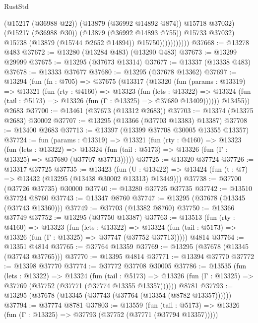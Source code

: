 \begin{lexlean}{RustStd}
\begin{coremodule}
                              (@15217 (@36988 @22))
                              (@13879 (@36992 @14892 @874))
                              @15718
                              @37032)
                            (@15217 (@36988 @30))
                            (@13879 (@36992 @14893 @755))
                            @15733
                            @37032)
                          @15738
                          (@13879 (@15744 @2652 @14894))
                          @15750)))))))))))
@37668 := @13278 @483
@37672 := @13280 (@13284 @483) (@13290 @483)
@37673 := @13299 @29999
@37675 := @13295 (@37673 @13314)
@37677 := @13337 (@13338 @483)
@37678 := @13333 @37677
@37680 := @13295 (@37678 @13362)
@37697 := @13294
    (fun (fn : @705) =>
    @37675
      (@13317
        (@13320
          (fun (params : @13319) =>
          @13321
            (fun (rty : @4160) =>
            @13323
              (fun (lets : @13322) =>
              @13324 (fun (tail : @5173) => @13326 (fun (Γ : @13325) => @37680 @13409))))))
        @13455))
    @2683
@37700 := @13461 (@37673 (@13312 @2683))
@37703 := @13374 (@13375 @2683) @30002
@37707 := @13295 (@13366 (@37703 @13383) @13387)
@37708 := @13400 @2683
@37713 := @13397 (@13399 @37708 @30005 @13355 @13357)
@37724 := fun (params : @13319) =>
  @13321
    (fun (rty : @4160) =>
    @13323
      (fun (lets : @13322) =>
      @13324 (fun (tail : @5173) => @13326 (fun (Γ : @13325) => @37680 (@37707 @37713)))))
@37725 := @13320 @37724
@37726 := @13317 @37725
@37735 := @13423
    (fun (U : @13422) => @13424 (fun (t : @7) => @13432 (@13295 (@13438 @30002 @13313) @13449)))
@37738 := @37700 (@37726 @37735) @30000
@37740 := @13280 @37725 @37735
@37742 := @13510 @37724 @8760
@37743 := @13347 @8760
@37747 := @13295 (@37678 (@13345 (@37743 @13360)))
@37749 := @37703 (@13382 @8760)
@37750 := @13366 @37749
@37752 := @13295 (@37750 @13387)
@37763 := @13513
    (fun (rty : @4160) =>
    @13323
      (fun (lets : @13322) =>
      @13324 (fun (tail : @5173) => @13326 (fun (Γ : @13325) => @37747 (@37752 @37713)))))
    @4814
@37764 := @13351 @4814
@37765 := @37764 @13359
@37769 := @13295 (@37678 (@13345 (@37743 @37765)))
@37770 := @13395 @4814
@37771 := @13394 @37770
@37772 := @13398 @37770
@37774 := @37772 @37708 @30005
@37786 := @13535
    (fun (lets : @13322) =>
    @13324
      (fun (tail : @5173) =>
      @13326 (fun (Γ : @13325) => @37769 (@37752 (@37771 (@37774 @13355 @13357))))))
    @8781
@37793 := @13295 (@37678 (@13345 (@37743 (@37764 (@13354 (@8782 @13357))))))
@37794 := @37774 @8781
@37803 := @13559
    (fun (tail : @5173) => @13326 (fun (Γ : @13325) => @37793 (@37752 (@37771 (@37794 @13357)))))

\end{coremodule}
\end{lexlean}
